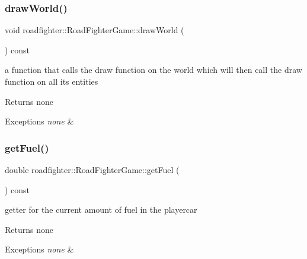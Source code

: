 \subsubsection{\texorpdfstring{draw\+World()}{drawWorld()}}
{\footnotesize\ttfamily void roadfighter\+::\+Road\+Fighter\+Game\+::draw\+World (\begin{DoxyParamCaption}{ }\end{DoxyParamCaption}) const}

a function that calls the draw function on the world which will then call the draw function on all its entities \begin{DoxyReturn}{Returns}
none 
\end{DoxyReturn}

\begin{DoxyExceptions}{Exceptions}
{\em none} & \\
\hline
\end{DoxyExceptions}
\mbox{\label{classroadfighter_1_1RoadFighterGame_a0915aa65c2ba6aeab74207d17cab1cd4}} 
\subsubsection{\texorpdfstring{get\+Fuel()}{getFuel()}}
{\footnotesize\ttfamily double roadfighter\+::\+Road\+Fighter\+Game\+::get\+Fuel (\begin{DoxyParamCaption}{ }\end{DoxyParamCaption}) const}

getter for the current amount of fuel in the playercar \begin{DoxyReturn}{Returns}
none 
\end{DoxyReturn}

\begin{DoxyExceptions}{Exceptions}
{\em none} & \\
\hline
\end{DoxyExceptions}
\mbox{\label{classroadfighter_1_1RoadFighterGame_a842fda5659dc00e28dcad71bbee02e22}} 
